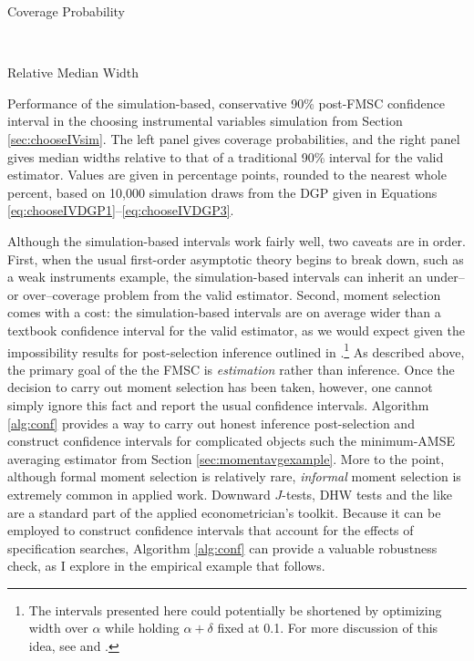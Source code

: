 \begin{table}[h]
\footnotesize
\centering
	\begin{subtable}{0.48\textwidth}
		\caption{Coverage Probability}
		\label{tab:chooseIVsim_cover_FMSC}
		
	\end{subtable}	
	~
	\begin{subtable}{0.48\textwidth}
		\caption{Relative Median Width}
		\label{tab:chooseIVsim_width_FMSC}
		
	\end{subtable}
\caption{Performance of the simulation-based, conservative 90\% post-FMSC confidence interval in the choosing instrumental variables simulation from Section \ref{sec:chooseIVsim}. The left panel gives coverage probabilities, and the right panel gives median widths relative to that of a traditional 90\% interval for the valid estimator. Values are given in percentage points, rounded to the nearest whole percent, based on 10,000 simulation draws from the DGP given in Equations \ref{eq:chooseIVDGP1}--\ref{eq:chooseIVDGP3}.}
\end{table}

Although the simulation-based intervals work fairly well, two caveats are in order.
First, when the usual first-order asymptotic theory begins to break down, such as a weak instruments example, the simulation-based intervals can inherit an under-- or over--coverage problem from the valid estimator.
Second, moment selection comes with a cost: the simulation-based intervals are on average wider than a textbook confidence interval for the valid estimator, as we would expect given the impossibility results for post-selection inference outlined in \cite{LeebPoetscher2005}.\footnote{The intervals presented here could potentially be shortened by optimizing width over $\alpha$ while holding $\alpha + \delta$ fixed at 0.1. For more discussion of this idea, see \cite{ClaeskensHjortbook} and \cite{McCloskey}.}
As described above, the primary goal of the the FMSC is \emph{estimation} rather than inference.
Once the decision to carry out moment selection has been taken, however, one cannot simply ignore this fact and report the usual confidence intervals.
Algorithm \ref{alg:conf} provides a way to carry out honest inference post-selection and construct confidence intervals for complicated objects such the minimum-AMSE averaging estimator from Section \ref{sec:momentavgexample}.
More to the point, although formal moment selection is relatively rare, \emph{informal} moment selection is extremely common in applied work.
Downward $J$-tests, DHW tests and the like are a standard part of the applied econometrician's toolkit.
Because it can be employed to construct confidence intervals that account for the effects of specification searches, Algorithm \ref{alg:conf} can provide a valuable robustness check, as I explore in the empirical example that follows.
